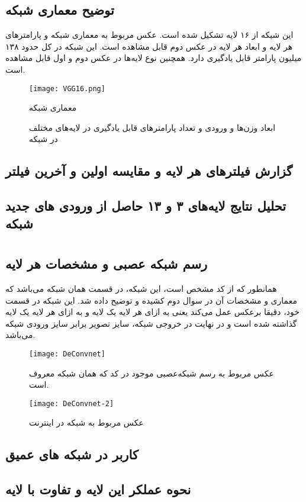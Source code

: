 \documentclass{article}
\begin{document}
\subsection{توضیح معماری شبکه }
این شبکه از ۱۶ لایه تشکیل شده است. عکس مربوط به معماری شبکه و پارامتر‌های هر لایه و ابعاد هر لایه در عکس دوم قابل مشاهده است. این شبکه در کل حدود ۱۳۸ میلیون 
پارامتر قابل یادگیری دارد. همچنین نوع لایه‌ها در عکس دوم و اول قابل مشاهده است.
\begin{figure}[H]
	\centerline{\texttt{[image: VGG16.png]}}
	\caption{معماری شبکه }
\end{figure}
\begin{figure}[H]
	\centering
	\caption {ابعاد وزن‌ها و ورودی و تعداد پارامتر‌های قابل یادگیری در لایه‌های مختلف در شبکه }
\end{figure}
\subsection{گزارش فیلتر‌های هر لایه و مقایسه اولین و آخرین فیلتر}
\subsection{تحلیل نتایج لایه‌های ۳ و ۱۳ حاصل از ورودی های جدید شبکه}
\section{}
\subsection{رسم شبکه عصبی و مشخصات هر لایه}
همانطور که از کد مشخص است، این شبکه، در قسمت  همان شبکه  می‌باشد که معماری و مشخصات آن در سوال دوم کشیده و توضیح داده شد. این شبکه در قسمت  خود، دقیقا برعکس  عمل می‌کند یعنی به ازای هر لایه  یک لایه  و به ازای هر لایه  یک لایه  گذاشته شده است و در نهایت در خروجی شبکه، سایز تصویر برابر 
سایز ورودی شبکه می‌باشد.
\begin{figure}[H]
	\centerline{\texttt{[image: DeConvnet]}}
	\caption{عکس مربوط به رسم شبکه‌عصبی موجود در کد  که همان شبکه معروف  است.}
\end{figure}

\begin{figure}[H]
	\centerline{\texttt{[image: DeConvnet-2]}}
	\caption{عکس مربوط به شبکه  در اینترنت}
\end{figure}
\subsection{کاربر در شبکه های عمیق}
\subsection{نحوه عملکر این لایه و تفاوت با لایه }
\end{document}
